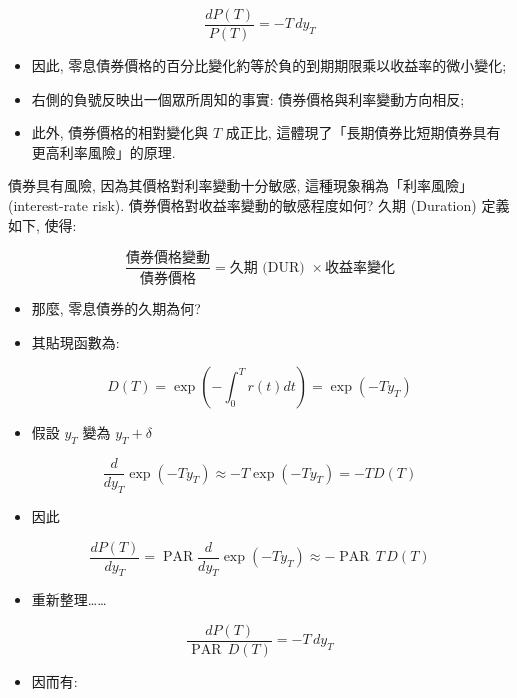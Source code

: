 \documentclass[letterpaper]{article}
\begin{document}
		$$
		\frac{dP (T) }{P (T) } = -T\, dy_{T}
		$$
		
		\begin{itemize}
			\item 因此, 零息債券價格的百分比變化約等於負的到期期限乘以收益率的微小變化; 
			\item 右側的負號反映出一個眾所周知的事實: 債券價格與利率變動方向相反; 
			\item 此外, 債券價格的相對變化與 $T$ 成正比, 這體現了「長期債券比短期債券具有更高利率風險」的原理.  
		\end{itemize}
		
		
		債券具有風險, 因為其價格對利率變動十分敏感, 這種現象稱為「利率風險」 (interest-rate risk).    債券價格對收益率變動的敏感程度如何?   久期 (Duration) 定義如下, 使得: 
		
		$$
		\frac{\text{債券價格變動}}{\text{債券價格}} = \text{久期 (DUR) } \times \text{收益率變化}
		$$
		
		\begin{itemize}
			\item 那麼, 零息債券的久期為何? 
			\item 其貼現函數為: 
		\end{itemize}
		
		
		$$
		D (T) =\exp \left (-\int_{0}^{T} r (t) d t\right) =\exp \left (-T y_{T}\right) 
		$$
		\begin{itemize}
			\item 假設 $y_{T}$ 變為 $y_{T} + \delta$
		\end{itemize}
		
		$$
		\frac{d}{d y_{T}} \exp\left (-T y_{T}\right) \approx -T \exp\left (-T y_{T}\right) = -T D (T) 
		$$
		
		\begin{itemize}
			\item 因此
		\end{itemize}
		
		$$
		\frac{d P (T) }{d y_{T}} = \operatorname{PAR} \frac{d}{d y_{T}} \exp\left (-T y_{T}\right) \approx -\operatorname{PAR}\, T\, D (T) 
		$$
		
		\begin{itemize}
			\item 重新整理……
		\end{itemize}
		
		$$
		\frac{d P (T) }{\operatorname{PAR}\, D (T) } = -T\, d y_{T}
		$$
		
		\begin{itemize}
			\item 因而有:
		\end{itemize}
		
\end{document}
